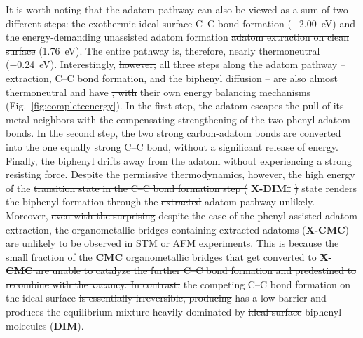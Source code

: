 \documentclass[aps,prb,amsmath,amssymb,11pt]{revtex4-1}
\newcommand{\zhzh}{\color{blue}}
\begin{document}
It is worth noting that the adatom pathway can also be viewed as a sum of two different steps: the exothermic ideal-surface C--C bond formation (\SI{-2.00}{\electronvolt}) and the energy-demanding {\zhzh unassisted adatom formation} \sout{adatom extraction on clean surface} (\SI{1.76}{\electronvolt}). 
The entire pathway is, therefore, nearly thermoneutral (\SI{-0.24}{\electronvolt}). 
Interestingly, \sout{however,} all three steps along the adatom pathway -- extraction, C--C bond
formation, and the biphenyl diffusion -- are also almost thermoneutral {\zhzh and have} \sout{, with} their own energy balancing mechanisms (Fig.~\ref{fig:completeenergy}). 
In the first step, the adatom escapes the pull of its metal neighbors with the compensating strengthening of the two phenyl-adatom bonds. In the second step, the {\zhzh two} strong carbon-adatom bonds are converted into \sout{the} {\zhzh one} equally strong C--C bond, without a significant release of energy. Finally, the biphenyl drifts away from the adatom without experiencing a strong resisting force. Despite the permissive thermodynamics, however, the high energy of the \sout{transition state in the C--C bond formation step (} \textbf{X-DIM$\ddagger$} \sout{)} {\zhzh state} renders the biphenyl formation through the \sout{extracted} adatom pathway unlikely.
Moreover, \sout{even with the surprising} {\zhzh despite the} ease of the phenyl-assisted adatom extraction, the organometallic bridges containing extracted adatoms (\textbf{X-CMC}) are unlikely to be observed in STM or AFM experiments. This is because \sout{the small fraction of the \textbf{CMC} organometallic bridges that get converted to \textbf{X-CMC} are unable to catalyze the further C--C bond formation and predestined to recombine with the vacancy. In contrast,} the competing C--C bond formation on the ideal surface \sout{is essentially irreversible, producing} {\zhzh has a low barrier and produces} the equilibrium mixture heavily dominated by \sout{ideal-surface} biphenyl molecules {\zhzh (\textbf{DIM})}. %
\end{document}
